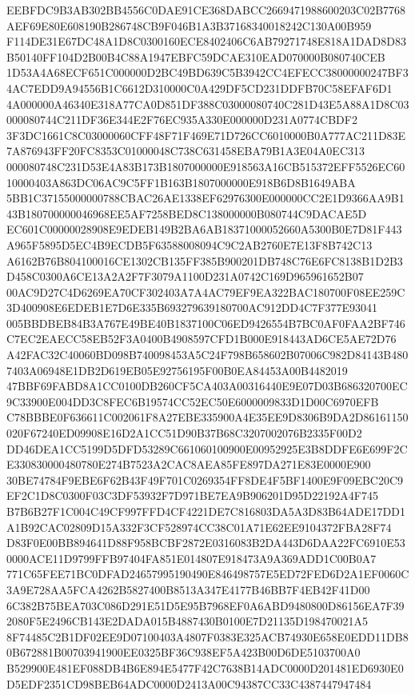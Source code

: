\documentclass[UTF8,fontset=fandol,zihao=-4,a4paper]{ctexart}
\begin{document}
{{EEBFDC9B3AB302BB4556C0DAE91CE368DABCC2669471988600203C02B7768AEF69E80E608190B286748CB9F046B1A3B37168340018242C130A00B959
F114DE31E67DC48A1D8C0300160ECE8402406C6AB79271748E818A1DAD8D83B50140FF104D2B00B4C88A1947EBFC59DCAE310EAD070000B080740CEB
1D53A4A68ECF651C000000D2BC49BD639C5B3942CC4EFECC38000000247BF34AC7EDD9A94556B1C6612D310000C0A429DF5CD231DDFB70C58EFAF6D1
4A000000A46340E318A77CA0D851DF388C03000080740C281D43E5A88A1D8C03000080744C211DF36E344E2F76EC935A330E000000D231A0774CBDF2
3F3DC1661C8C03000060CFF48F71F469E71D726CC6010000B0A777AC211D83E7A876943FF20FC8353C01000048C738C631458EBA79B1A3E04A0EC313
000080748C231D53E4A83B173B1807000000E918563A16CB515372EFF5526EC6010000403A863DC06AC9C5FF1B163B1807000000E918B6D8B1649ABA
5BB1C37155000000788CBAC26AE1338EF62976300E000000CC2E1D9366AA9B143B180700000046968EE5AF7258BED8C138000000B080744C9DACAE5D
EC601C00000028908E9EDEB149B2BA6AB18371000052660A5300B0E7D81F443A965F5895D5EC4B9ECDB5F63588008094C9C2AB2760E7E13F8B742C13
A6162B76B804100016CE1302CB135FF385B900201DB748C76E6FC8138B1D2B3D458C0300A6CE13A2A2F7F3079A1100D231A0742C169D965961652B07
00AC9D27C4D6269EA70CF302403A7A4AC79EF9EA322BAC180700F08EE259C3D400908E6EDEB1E7D6E335B693279639180700AC912DD4C7F377E93041
005BBDBEB84B3A767E49BE40B1837100C06ED9426554B7BC0AF0FAA2BF746C7EC2EAECC58EB52F3A0400B4908597CFD1B000E918443AD6CE5AE72D76
A42FAC32C40060BD098B740098453A5C24F798B658602B07006C982D84143B4807403A06948E1DB2D619EB05E92756195F00B0EA84453A00B4482019
47BBF69FABD8A1CC0100DB260CF5CA403A00316440E9E07D03B686320700EC9C33900E004DD3C8FEC6B19574CC52EC50E6000009833D1D00C6970EFB
C78BBBE0F636611C002061F8A27EBE335900A4E35EE9D8306B9DA2D86161150020F67240ED09908E16D2A1CC51D90B37B68C3207002076B2335F00D2
DD46DEA1CC5199D5DFD53289C661060100900E00952925E3B8DDFE6E699F2CE330830000480780E274B7523A2CAC8AEA85FE897DA271E83E0000E900
30BE74784F9EBE6F62B43F49F701C0269354FF8DE4F5BF1400E9F09EBC20C9EF2C1D8C0300F03C3DF53932F7D971BE7EA9B906201D95D22192A4F745
B7B6B27F1C004C49CF997FFD4CF4221DE7C816803DA5A3D83B64ADE17DD1A1B92CAC02809D15A332F3CF528974CC38C01A71E62EE9104372FBA28F74
D83F0E00BB894641D88F958BCBF2872E0316083B2DA443D6DAA22FC6910E530000ACE11D9799FFB97404FA851E014807E918473A9A369ADD1C00B0A7
771C65FEE71BC0DFAD24657995190490E846498757E5ED72FED6D2A1EF0060C3A9E728AA5FCA4262B5827400B8513A347E4177B46BB7F4EB42F41D00
6C382B75BEA703C086D291E51D5E95B7968EF0A6ABD9480800D86156EA7F392080F5E2496CB143E2DADA015B4887430B0100E7D21135D198470021A5
8F74485C2B1DF02EE9D07100403A4807F0383E325ACB74930E658E0EDD11DB80B672881B00703941900EE0325BF36C938EF5A423B00D6DE5103700A0
B529900E481EF088DB4B6E894E5477F42C7638B14ADC0000D201481ED6930E0D5EDF2351CD98BEB64ADC0000D2413A00C94387CC33C4387447947484
}}
\end{document}
